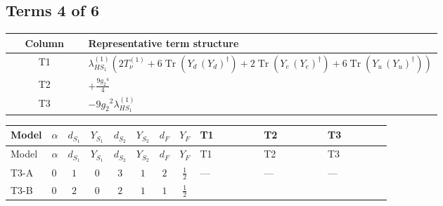 \documentclass[8pt]{article}
\begin{document}
\begin{landscape}
\subsection*{Terms 4 of 6}
\begin{center}
\begin{tabular}{@{}c >{\raggedright\arraybackslash}p{0.82\linewidth}@{}}
\toprule
Column & Representative term structure \\
\midrule
T1 & \(\displaystyle {\lambda_{HS_1}^{(1)}} (2 T_{\nu}^{(1)}+6 \operatorname{Tr}\!\left({Y_d}\,\left({Y_d}\right)^{\dagger}\right)+2 \operatorname{Tr}\!\left({Y_e}\,\left({Y_e}\right)^{\dagger}\right)+6 \operatorname{Tr}\!\left({Y_u}\,\left({Y_u}\right)^{\dagger}\right))\) \\
\midrule
T2 & \(\displaystyle +\frac{9 {g_2}^4}{4}\) \\
\midrule
T3 & \(\displaystyle -9 {g_2}^2 {\lambda_{HS_1}^{(1)}}\) \\
\midrule
\bottomrule
\end{tabular}
\end{center}
\smallskip
\tiny
\begin{longtable}{@{}llcccccc >{\raggedright\arraybackslash}p{0.21\linewidth} >{\raggedright\arraybackslash}p{0.21\linewidth} >{\raggedright\arraybackslash}p{0.21\linewidth}@{}}
\toprule
Model & $\alpha$ & $d_{S_1}$ & $Y_{S_1}$ & $d_{S_2}$ & $Y_{S_2}$ & $d_F$ & $Y_F$ & T1 & T2 & T3 \\
\midrule
\endfirsthead
\toprule
Model & $\alpha$ & $d_{S_1}$ & $Y_{S_1}$ & $d_{S_2}$ & $Y_{S_2}$ & $d_F$ & $Y_F$ & T1 & T2 & T3 \\
\midrule
\endhead
T3-A & $0$ & $1$ & $0$ & $3$ & $1$ & $2$ & $\frac{1}{2}$ & --- & --- & --- \\
\midrule
T3-B & $0$ & $2$ & $0$ & $2$ & $1$ & $1$ & $\frac{1}{2}$ & \scriptsize\adjustbox{max width=\linewidth}{$\begin{gathered} {\lambda_{HS_1}^{(1)}} (2 T_{\nu}^{(1)}+6 \operatorname{Tr}\!\left({Y_d}\,\left({Y_d}\right)^{\dagger}\right)+2 \operatorname{Tr}\!\left({Y_e}\,\left({Y_e}\right)^{\dagger}\right)+6 \operatorname{Tr}\!\left({Y_u}\,\left({Y_u}\right)^{\dagger}\right))\end{gathered}$} & \scriptsize\adjustbox{max width=\linewidth}{$\begin{gathered} +\frac{9 {g_2}^4}{4}\end{gathered}$} & \scriptsize\adjustbox{max width=\linewidth}{$\begin{gathered} -9 {g_2}^2 {\lambda_{HS_1}^{(1)}}\end{gathered}$} \\

\end{longtable}
\end{landscape}
\end{document}
